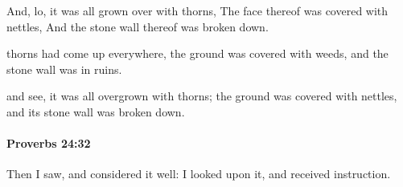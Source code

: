 			\begin{versebox}
					\item[BHS] 
					\item[ASV] And, lo, it was all grown over with thorns, The face thereof was covered with nettles, And the stone wall thereof was broken down.
					\item[NIV] thorns had come up everywhere, the ground was covered with weeds, and the stone wall was in ruins.
					\item[NRSV] and see, it was all overgrown with thorns; the ground was covered with nettles, and its stone wall was broken down.
			\end{versebox}

		\paragraph{Proverbs 24:32} %
			\label{PROVERBS-24-32}

			Then I saw, and considered it well: I looked upon it, and received instruction.


